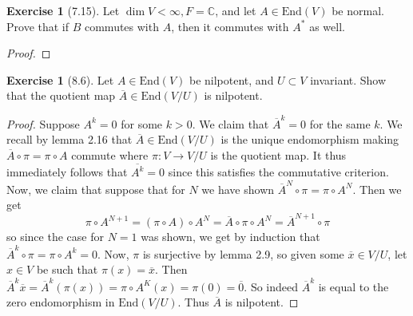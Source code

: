 \documentclass[reqno]{amsart}
\theoremstyle{definition}
\newtheorem{exercise}[theorem]{Exercise}
\theoremstyle{remark}
\newcommand{\End}{{\mathrm{End}}}
\begin{document}
\begin{exercise}[7.15]
    Let $\dim V < \infty, F = \mathbb{C}$, and let
    $A \in \End (V)$ be normal. Prove that if $B$ commutes
    with $A$, then it commutes with $A^{*}$ as well.
\end{exercise}

\begin{proof}
    
\end{proof}








    \begin{exercise}[8.6]
       Let $A \in \End (V)$ be nilpotent, and
       $U \subset V$ invariant. Show that the quotient
       map $\overline{A} \in \End \left( V/U \right) $ 
       is nilpotent.
    \end{exercise}

    \begin{proof}
        Suppose $A^{k} = 0$ for some $k > 0$.
        We claim that $\overline{A}^{k} = 0$ for the same $k$.
        We recall by lemma 2.16 that 
        $\overline{A} \in \End \left( V/U  \right) $ is
        the unique endomorphism making
        $\overline{A} \circ \pi = \pi \circ A$ commute
        where $\pi \colon
        V \to V / U$ is the quotient map.
        It thus immediately follows that
        $\overline{A^{k}} = 0$ since
        this satisfies the commutative criterion. 
        Now, we claim
        that suppose that for $N$ we have shown
        $\overline{A}^{N} \circ \pi = \pi \circ A^{N}$. Then
        we get
        \[
            \pi \circ A^{N+1}
            = \left( \pi \circ A \right) \circ A^{N}
            = \overline{A} \circ \pi \circ A^{N}
            = \overline{A}^{N+1} \circ \pi
        \] 
        so since the case for $N = 1$ was shown, we
        get by induction that
        $\overline{A}^{k} \circ \pi = 
        \pi \circ A^{k} = 0$.
        Now, $\pi $ is surjective by lemma
        2.9, so given some 
        $\overline{x} \in 
        V / U$, let $x \in V$ be such that
        $\pi (x) = \overline{x}$. Then
        $\overline{A}^{k} \overline{x}
        = \overline{A}^{k} \left( \pi (x) \right) 
        = \pi \circ A^{K} (x)
        = \pi (0) = \overline{0}$. So
        indeed $\overline{A}^{k}$ is equal to
        the zero endomorphism in
        $\End \left( V /U \right) $. Thus
        $\overline{A}$ is nilpotent.

    \end{proof}
\end{document}
